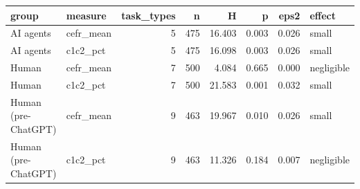 \begin{tabular}{llrrrrrl}
\toprule
group & measure & task_types & n & H & p & eps2 & effect \\
\midrule
AI agents & cefr_mean & 5 & 475 & 16.403 & 0.003 & 0.026 & small \\
AI agents & c1c2_pct & 5 & 475 & 16.098 & 0.003 & 0.026 & small \\
Human & cefr_mean & 7 & 500 & 4.084 & 0.665 & 0.000 & negligible \\
Human & c1c2_pct & 7 & 500 & 21.583 & 0.001 & 0.032 & small \\
Human (pre-ChatGPT) & cefr_mean & 9 & 463 & 19.967 & 0.010 & 0.026 & small \\
Human (pre-ChatGPT) & c1c2_pct & 9 & 463 & 11.326 & 0.184 & 0.007 & negligible \\
\bottomrule
\end{tabular}

